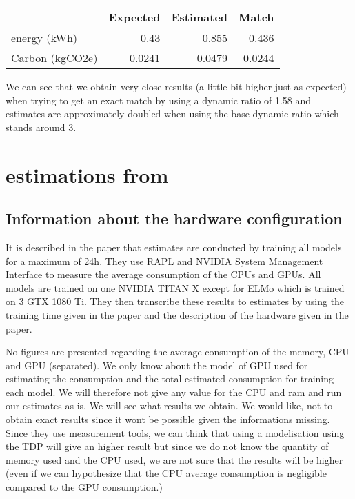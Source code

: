 \documentclass[11pt]{article}
\begin{document}
\begin{center}
\begin{tabular}{lrrr}
 & Expected & Estimated & Match\\
\hline
energy (kWh) & 0.43 & 0.855 & 0.436\\
Carbon (kgCO2e) & 0.0241 & 0.0479 & 0.0244\\
\end{tabular}
\end{center}


We can see that we obtain very close results (a little bit higher just
as expected) when trying to get an
exact match by using a dynamic ratio of 1.58 and estimates are
approximately doubled when using the base dynamic ratio which stands
around 3.

\section{estimations from \cite{Strubell2019energy}}
\label{sec:orgec6ba19}

\subsection{Information about the hardware configuration}
\label{sec:org6a0a73e}

It is described in the paper that estimates are conducted by training
all models for a maximum of 24h. They use RAPL and NVIDIA System
Management Interface to measure the average consumption of the CPUs and
GPUs. 
All models are trained on one NVIDIA TITAN X except for ELMo
which is trained on 3 GTX 1080 Ti.
They then transcribe these results to estimates by using the training
time given in the paper and the description of the hardware given in
the paper.

No figures are presented regarding the average consumption of the
memory, CPU and GPU (separated). We only know about the model of GPU used for
estimating the consumption and the total estimated consumption for
training each model. We will therefore not give any value for
the CPU and ram and run our estimates as is. We will see what results
we obtain. We would like, not to obtain exact results since it wont be
possible given the informations missing. Since they use measurement
tools, we can think that using a modelisation using the TDP will give
an higher result but since we do not know the quantity of memory used
and the CPU used, we are not sure that the results will be higher
(even if we can hypothesize that the CPU average consumption is
negligible compared to the GPU consumption.)
\end{document}
